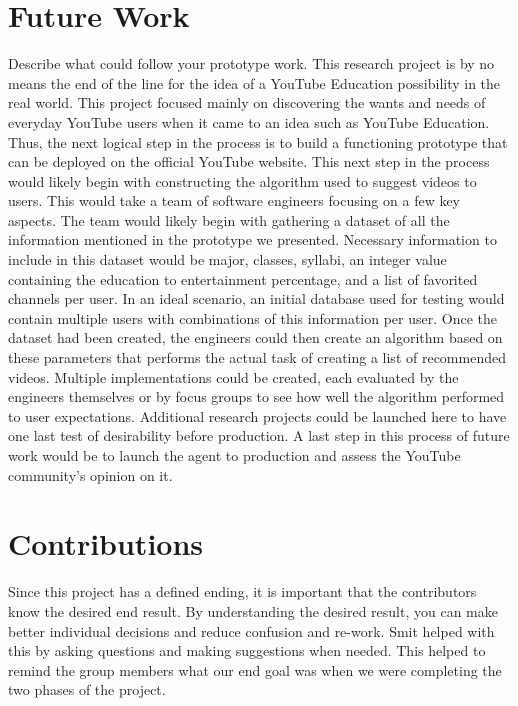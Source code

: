 \documentclass[letterpaper]{article} %
\begin{document}
\section{Future Work}
Describe what could follow your prototype work.
This research project is by no means the end of the line for the idea of a YouTube Education possibility in the real world. This project focused mainly on discovering the wants and needs of everyday YouTube users when it came to an idea such as YouTube Education. Thus, the next logical step in the process is to build a functioning prototype that can be deployed on the official YouTube website.
This next step in the process would likely begin with constructing the algorithm used to suggest videos to users. This would take a team of software engineers focusing on a few key aspects. The team would likely begin with gathering a dataset of all the information mentioned in the prototype we presented. Necessary information to include in this dataset would be major, classes, syllabi, an integer value containing the education to entertainment percentage, and a list of favorited channels per user. In an ideal scenario, an initial database used for testing would contain multiple users with combinations of this information per user.
Once the dataset had been created, the engineers could then create an algorithm based on these parameters that performs the actual task of creating a list of recommended videos. Multiple implementations could be created, each evaluated by the engineers themselves or by focus groups to see how well the algorithm performed to user expectations. Additional research projects could be launched here to have one last test of desirability before production.
A last step in this process of future work would be to launch the agent to production and assess the YouTube community’s opinion on it.


\section{Contributions}
Since this project has a defined ending, it is important that the contributors know the desired end result. By understanding the desired result, you can make better individual decisions and reduce confusion and re-work. Smit helped with this by asking questions and making suggestions when needed. This helped to remind the group members what our end goal was when we were completing the two phases of the project. 
\end{document}
